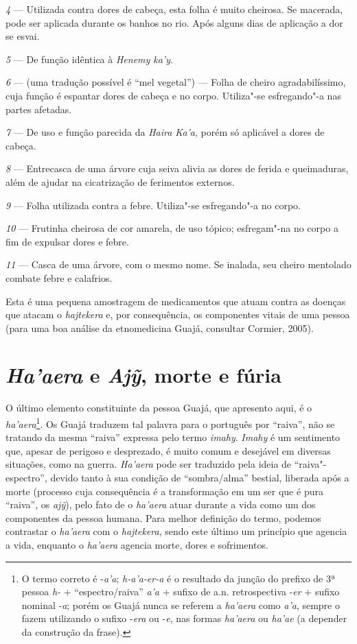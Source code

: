\emph{4} --- Utilizada contra dores de cabeça, esta folha é
muito cheirosa. Se macerada, pode ser aplicada durante os banhos no rio.
Após alguns dias de aplicação a dor se esvai.

\emph{5} --- De função idêntica à \emph{Henemy ka'y}.

\emph{6} --- (uma tradução possível é ``mel vegetal'') --- Folha de
cheiro agradabilíssimo, cuja função é espantar dores de cabeça e no
corpo. Utiliza"-se esfregando"-a nas partes afetadas.

\emph{7} --- De uso e função parecida da \emph{Haira Ka'a},
porém só aplicável a dores de cabeça.

\emph{8} --- Entrecasca de uma árvore cuja seiva alivia as dores
de ferida e queimaduras, além de ajudar na cicatrização de ferimentos
externos.

\emph{9} --- Folha utilizada contra a febre. Utiliza"-se
esfregando"-a no corpo.

\emph{10} --- Frutinha cheirosa de cor amarela, de uso tópico;
esfregam"-na no corpo a fim de expulsar dores e febre.

\emph{11} --- Casca de uma árvore, com o mesmo nome. Se inalada,
seu cheiro mentolado combate febre e calafrios.

Esta é uma pequena amostragem de medicamentos que atuam contra as
doenças que atacam o \emph{hajtekera} e, por consequência, os
componentes vitais de uma pessoa (para uma boa análise da etnomedicina
Guajá, consultar Cormier, 2005).

\section{\emph{Ha'aera} e \emph{Ajỹ}, morte e
fúria}\label{haaera-e-ajy-morte-e-fuxfaria}

O último elemento constituinte da pessoa Guajá, que apresento aqui, é o
\emph{ha'aera}\footnote{O termo correto é -\emph{a'a}; \emph{h-a'a-er-a}
  é o resultado da junção do prefixo de 3ª pessoa \emph{h-} +
  ``espectro/raiva'' \emph{a'a} + sufixo de a.n. retrospectiva -\emph{er} + sufixo nominal -\emph{a}; porém os Guajá nunca se referem a
  \emph{ha'aera} como \emph{a'a}, sempre o fazem utilizando o sufixo -\emph{era}
  ou -\emph{e}, nas formas \emph{ha'aera} ou \emph{ha'ae} (a depender da
  construção da frase).}. Os Guajá traduzem tal palavra para o português
por ``raiva'', não se tratando da mesma ``raiva'' expressa pelo termo
\emph{imahy}. \emph{Imahy} é um sentimento que, apesar de perigoso e
desprezado, é muito comum e desejável em diversas situações, como na
guerra. \emph{Ha'aera} pode ser traduzido pela ideia de
``raiva"-espectro'', devido tanto à sua condição de ``sombra/alma'' bestial,
liberada após a morte (processo cuja consequência é a transformação em
um ser que é pura ``raiva'', os \emph{ajỹ}), pelo fato de o \emph{ha'aera}
atuar durante a vida como um dos componentes da pessoa humana. Para
melhor definição do termo, podemos contrastar o \emph{ha'aera} com o
\emph{hajtekera}, sendo este último um princípio que agencia a vida,
enquanto o \emph{ha'aera} agencia morte, dores e sofrimentos.


